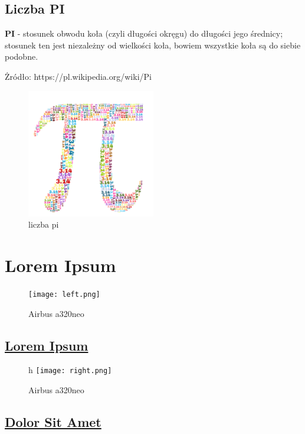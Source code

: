 \documentclass[]{article}
\begin{document}
\subsection{Liczba PI}
\textbf{PI} - stosunek obwodu koła (czyli długości okręgu) do długości jego średnicy; stosunek ten jest niezależny od wielkości koła, bowiem wszystkie koła są do siebie podobne. 
\begin{flushright}
\scriptsize
Żródło: https://pl.wikipedia.org/wiki/Pi
\end{flushright}

    \begin{figure}[h]
    \centering
    \includegraphics[width=0.5\textwidth]{pi.png}
    \caption{liczba pi}
    \label{img:liczbapi}
    \end{figure}

\newpage 

\section{Lorem Ipsum}
	\begin{figure}
  \centering
  \texttt{[image: left.png]}
  \caption{Airbus a320neo}
  \label{img:a320nairportl}
\end{figure}
    \subsection{\underline{Lorem Ipsum}}
    \lipsum[1-7]
	\begin{figure}{h}
  \centering
  \texttt{[image: right.png]}
  \caption{Airbus a320neo}
  \label{img:a320nairportr}
\end{figure}
\newpage
    \subsection{\underline{Dolor Sit Amet}}
    \lipsum[7-14]
\end{document}
